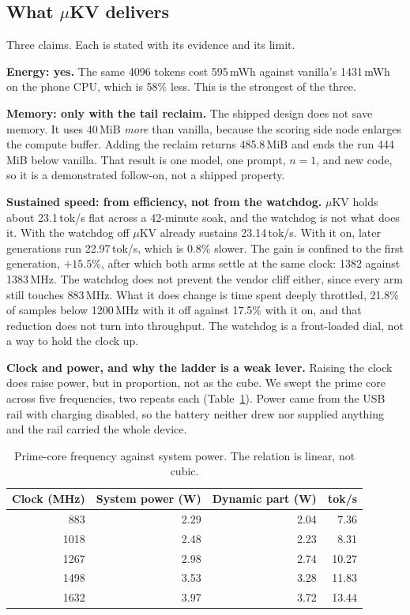 \documentclass[11pt]{article}
\begin{document}
\subsection{What $\mu$KV delivers}
Three claims. Each is stated with its evidence and its limit.

\textbf{Energy: yes.} The same 4096 tokens cost 595\,mWh against vanilla's 1431\,mWh on the
phone CPU, which is 58\% less. This is the strongest of the three.

\textbf{Memory: only with the tail reclaim.} The shipped design does not save memory. It uses
40\,MiB \emph{more} than vanilla, because the scoring side node enlarges the compute buffer.
Adding the reclaim returns 485.8\,MiB and ends the run 444\,MiB below vanilla. That result is
one model, one prompt, $n{=}1$, and new code, so it is a demonstrated follow-on, not a
shipped property.

\textbf{Sustained speed: from efficiency, not from the watchdog.} $\mu$KV holds about
23.1\,tok/s flat across a 42-minute soak, and the watchdog is not what does it. With the
watchdog off $\mu$KV already sustains 23.14\,tok/s. With it on, later generations run
22.97\,tok/s, which is 0.8\% slower. The gain is confined to the first generation, $+15.5\%$,
after which both arms settle at the same clock: 1382 against 1383\,MHz. The watchdog does not
prevent the vendor cliff either, since every arm still touches 883\,MHz. What it does change
is time spent deeply throttled, 21.8\% of samples below 1200\,MHz with it off against 17.5\%
with it on, and that reduction does not turn into throughput. The watchdog is a front-loaded
dial, not a way to hold the clock up.

\textbf{Clock and power, and why the ladder is a weak lever.} Raising the clock does raise
power, but in proportion, not as the cube. We swept the prime core across five frequencies, two repeats each (Table~\ref{tab:power}). Power came from the USB
rail with charging disabled, so the battery neither drew nor supplied anything and the rail
carried the whole device.

\begin{table}[h]\centering\small
\caption{Prime-core frequency against system power. The relation is linear, not cubic.}
\label{tab:power}
\begin{tabular}{@{}rrrr@{}}
\toprule
\textbf{Clock (MHz)} & \textbf{System power (W)} & \textbf{Dynamic part (W)} & \textbf{tok/s}\\
\midrule
883  & 2.29 & 2.04 & 7.36\\
1018 & 2.48 & 2.23 & 8.31\\
1267 & 2.98 & 2.74 & 10.27\\
1498 & 3.53 & 3.28 & 11.83\\
1632 & 3.97 & 3.72 & 13.44\\
\bottomrule
\end{tabular}
\end{table}
\end{document}
